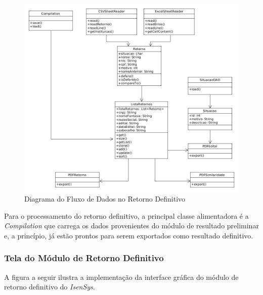 \documentclass[
	12pt,			%
	openright,		%
	oneside,	
	a4paper,		%
	english,		%
	brazil			%
]{abntex2/abntex2}  %
\begin{document}
					\begin{figure}[H]
						\begin{center}
							
							\caption{Diagrama do Fluxo de Dados no Retorno Definitivo}
							\label{retorno-def-uml}
							
							\includegraphics[scale=0.5]{img/retorno-def-uml}
							
						\end{center}
					\end{figure}
	
					Para o processamento do retorno definitivo, a principal classe alimentadora é a \textit{Compilation} que carrega os dados provenientes do módulo de resultado preliminar e, a princípio, já estão prontos para serem exportados como resultado definitivo.
	
				\subsubsection{Tela do Módulo de Retorno Definitivo}
	
					A figura a seguir ilustra a implementação da interface gráfica do módulo de retorno definitivo do \textit{IsenSys}.
	
\end{document}
